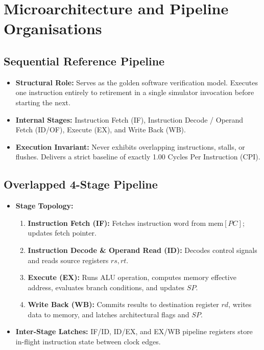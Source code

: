 \documentclass[11pt,a4paper]{article}
\begin{document}
\section{Microarchitecture and Pipeline Organisations}

\subsection{Sequential Reference Pipeline}
\begin{itemize}
    \item \textbf{Structural Role:} Serves as the golden software verification model. Executes one instruction entirely to retirement in a single simulator invocation before starting the next.
    \item \textbf{Internal Stages:} Instruction Fetch (IF), Instruction Decode / Operand Fetch (ID/OF), Execute (EX), and Write Back (WB).
    \item \textbf{Execution Invariant:} Never exhibits overlapping instructions, stalls, or flushes. Delivers a strict baseline of exactly 1.00 Cycles Per Instruction (CPI).
\end{itemize}

\subsection{Overlapped 4-Stage Pipeline}
\begin{itemize}
    \item \textbf{Stage Topology:}
    \begin{enumerate}
        \item \textbf{Instruction Fetch (IF):} Fetches instruction word from $\text{mem}[PC]$; updates fetch pointer.
        \item \textbf{Instruction Decode \& Operand Read (ID):} Decodes control signals and reads source registers $rs, rt$.
        \item \textbf{Execute (EX):} Runs ALU operation, computes memory effective address, evaluates branch conditions, and updates $SP$.
        \item \textbf{Write Back (WB):} Commits results to destination register $rd$, writes data to memory, and latches architectural flags and $SP$.
    \end{enumerate}
    \item \textbf{Inter-Stage Latches:} IF/ID, ID/EX, and EX/WB pipeline registers store in-flight instruction state between clock edges.
\end{itemize}
\end{document}
